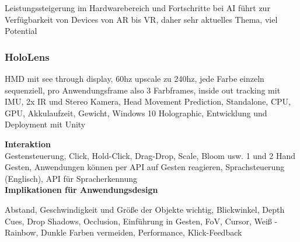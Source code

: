 Leistungssteigerung im Hardwarebereich und Fortschritte bei AI führt zur Verfügbarkeit von Devices von AR bis VR, daher sehr aktuelles Thema, viel Potential

\subsubsection{HoloLens}
\label{sec-2-1-2}
	

HMD mit see through display, 60hz upscale zu 240hz, jede Farbe einzeln sequenziell, pro Anwendungsframe also 3 Farbframes, inside out tracking mit IMU, 2x IR und Stereo Kamera, Head Movement Prediction, Standalone, CPU, GPU, Akkulaufzeit, Gewicht, Windows 10 Holographic, Entwicklung und Deployment mit Unity

\textbf{Interaktion}\\

Gestensteuerung, Click, Hold-Click, Drag-Drop, Scale, Bloom usw. 1 und 2 Hand Gesten, Anwendungen können per API auf Gesten reagieren, Sprachsteuerung (Englisch), API für Spracherkennung\\

\textbf{Implikationen für Anwendungsdesign}

Abstand, Geschwindigkeit und Größe der Objekte wichtig, Blickwinkel, Depth Cues, Drop Shadows, Occlusion, Einführung in Gesten, FoV, Cursor, Weiß - Rainbow, Dunkle Farben vermeiden, Performance, Klick-Feedback